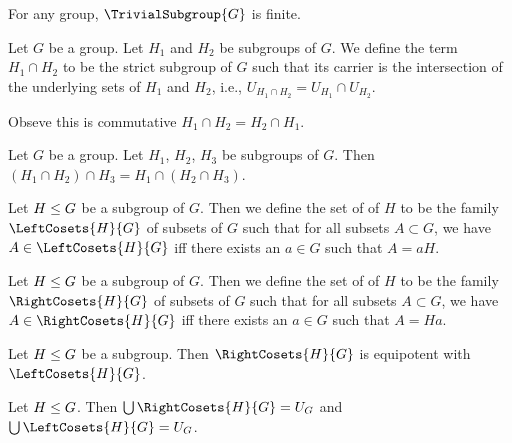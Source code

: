 \begin{theorem}
For any group, $\TrivialSubgroup{G}$ is finite.
\end{theorem}

\begin{definition}
Let $G$ be a group.
Let $H_{1}$ and $H_{2}$ be subgroups of $G$.
We define the term $H_{1}\cap H_{2}$ to be the strict subgroup of $G$
such that its carrier is the intersection of the underlying sets of
$H_{1}$ and $H_{2}$, i.e., $U_{H_{1}\cap H_{2}}=U_{H_{1}}\cap U_{H_{2}}$.

Obseve this is commutative $H_{1}\cap H_{2}=H_{2}\cap H_{1}$.
\end{definition}

\begin{theorem}
Let $G$ be a group. Let $H_{1}$, $H_{2}$, $H_{3}$ be subgroups of $G$.
Then $(H_{1}\cap H_{2})\cap H_{3}=H_{1}\cap(H_{2}\cap H_{3})$.
\end{theorem}

\begin{definition}
Let $H\leq G$ be a subgroup of $G$.
Then we define the set of  of $H$ to be the family $\LeftCosets{H}{G}$
of subsets of $G$ such that for all subsets $A\subset G$, we have
$A\in\LeftCosets{H}{G}$ iff there exists an $a\in G$ such that $A=aH$.
\end{definition}

\begin{definition}
Let $H\leq G$ be a subgroup of $G$.
Then we define the set of  of $H$ to be the family $\RightCosets{H}{G}$
of subsets of $G$ such that for all subsets $A\subset G$, we have
$A\in\RightCosets{H}{G}$ iff there exists an $a\in G$ such that $A=Ha$.
\end{definition}

\begin{theorem}
Let $H\leq G$ be a subgroup.
Then $\RightCosets{H}{G}$ is equipotent with $\LeftCosets{H}{G}$.
\end{theorem}

\begin{theorem}
Let $H\leq G$.
Then $\Union\RightCosets{H}{G}=U_{G}$ and $\Union\LeftCosets{H}{G}=U_{G}$.
\end{theorem}


